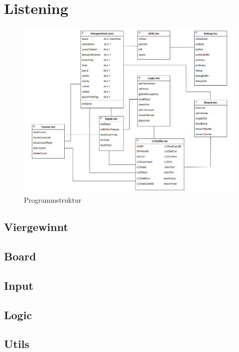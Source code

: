 \newpage
\chapter{Listening}
    \begin{figure}[H]
        \centering
        \includegraphics[scale=0.5]{img/programmstruktur.png}    
        \caption{Programmstruktur}
        \label{fig:programmsturktur}
    \end{figure}
    \newpage
    \section{Viergewinnt}
        
    \newpage
    \section{Board}
        
    \newpage
    \section{Input}
        
    \newpage
    \section{Logic}
        
    \newpage
    \section{Utils}
        
    \newpage
